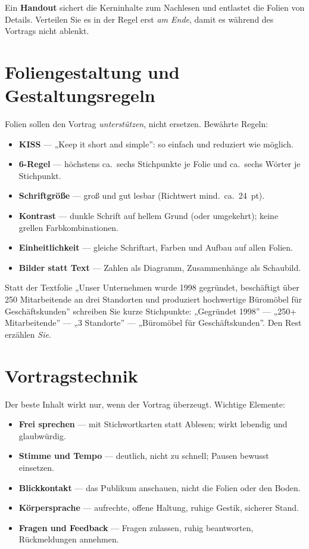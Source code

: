 \documentclass[11pt, a4paper]{article}
\begin{document}
\begin{merksatz}
Ein \textbf{Handout} sichert die Kerninhalte zum Nachlesen und entlastet die Folien von
Details. Verteilen Sie es in der Regel erst \emph{am Ende}, damit es während des Vortrags
nicht ablenkt.
\end{merksatz}

\section{Foliengestaltung und Gestaltungsregeln}

Folien sollen den Vortrag \emph{unterstützen}, nicht ersetzen. Bewährte Regeln:

\begin{itemize}
  \item \textbf{KISS} --- „Keep it short and simple”: so einfach und reduziert wie möglich.
  \item \textbf{6-Regel} --- höchstens ca.\ sechs Stichpunkte je Folie und ca.\ sechs Wörter je Stichpunkt.
  \item \textbf{Schriftgröße} --- groß und gut lesbar (Richtwert mind.\ ca.\ 24~pt).
  \item \textbf{Kontrast} --- dunkle Schrift auf hellem Grund (oder umgekehrt); keine grellen Farbkombinationen.
  \item \textbf{Einheitlichkeit} --- gleiche Schriftart, Farben und Aufbau auf allen Folien.
  \item \textbf{Bilder statt Text} --- Zahlen als Diagramm, Zusammenhänge als Schaubild.
\end{itemize}

\begin{beispiel}
Statt der Textfolie „Unser Unternehmen wurde 1998 gegründet, beschäftigt über 250
Mitarbeitende an drei Standorten und produziert hochwertige Büromöbel für Geschäftskunden”
schreiben Sie kurze Stichpunkte: „Gegründet 1998” --- „250+ Mitarbeitende” --- „3 Standorte”
--- „Büromöbel für Geschäftskunden”. Den Rest erzählen \emph{Sie}.
\end{beispiel}

\section{Vortragstechnik}

Der beste Inhalt wirkt nur, wenn der Vortrag überzeugt. Wichtige Elemente:

\begin{itemize}
  \item \textbf{Frei sprechen} --- mit Stichwortkarten statt Ablesen; wirkt lebendig und glaubwürdig.
  \item \textbf{Stimme und Tempo} --- deutlich, nicht zu schnell; Pausen bewusst einsetzen.
  \item \textbf{Blickkontakt} --- das Publikum anschauen, nicht die Folien oder den Boden.
  \item \textbf{Körpersprache} --- aufrechte, offene Haltung, ruhige Gestik, sicherer Stand.
  \item \textbf{Fragen und Feedback} --- Fragen zulassen, ruhig beantworten, Rückmeldungen annehmen.
\end{itemize}
\end{document}
